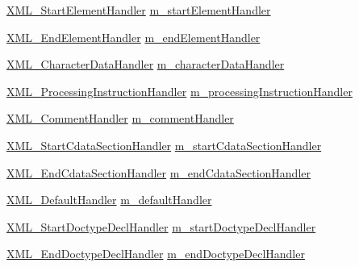 \begin{DoxyCompactItemize}
\item 
\hyperlink{amiga_2include_2libraries_2expat_8h_ae673a34e69303b3e6e9d112ddcc86aad}{X\+M\+L\+\_\+\+Start\+Element\+Handler} \hyperlink{struct_x_m_l___parser_struct_a26ab50091182d50019ce89e2ee3470f2}{m\+\_\+start\+Element\+Handler}
\item 
\hyperlink{amiga_2include_2libraries_2expat_8h_a4c030e2ecb6cf8f953541923e0c5c4bc}{X\+M\+L\+\_\+\+End\+Element\+Handler} \hyperlink{struct_x_m_l___parser_struct_a34f436a34d445e34bd94e45a39ec049c}{m\+\_\+end\+Element\+Handler}
\item 
\hyperlink{amiga_2include_2libraries_2expat_8h_a49ea4b8c43b9d179add2746e20a5db97}{X\+M\+L\+\_\+\+Character\+Data\+Handler} \hyperlink{struct_x_m_l___parser_struct_ae0b82e8ee9b1917e4985d2414a971cff}{m\+\_\+character\+Data\+Handler}
\item 
\hyperlink{amiga_2include_2libraries_2expat_8h_aea2f9d08064fb45ff04f9e74b6b407c2}{X\+M\+L\+\_\+\+Processing\+Instruction\+Handler} \hyperlink{struct_x_m_l___parser_struct_adf3617fbf15fbfaba11fce4fbf7a0e5a}{m\+\_\+processing\+Instruction\+Handler}
\item 
\hyperlink{amiga_2include_2libraries_2expat_8h_a7bf5731181aec35012d70d1634edcef1}{X\+M\+L\+\_\+\+Comment\+Handler} \hyperlink{struct_x_m_l___parser_struct_a11f04d39e260cdc3355961c41cde40e8}{m\+\_\+comment\+Handler}
\item 
\hyperlink{amiga_2include_2libraries_2expat_8h_a68a18e698f04c0cfedac814093d01a43}{X\+M\+L\+\_\+\+Start\+Cdata\+Section\+Handler} \hyperlink{struct_x_m_l___parser_struct_af177c35f5a57d5690ba8c20421db3bf9}{m\+\_\+start\+Cdata\+Section\+Handler}
\item 
\hyperlink{amiga_2include_2libraries_2expat_8h_a52f3541344fd2e255bbd06f6b08321e2}{X\+M\+L\+\_\+\+End\+Cdata\+Section\+Handler} \hyperlink{struct_x_m_l___parser_struct_a70db3e55041515448701d7243f289b05}{m\+\_\+end\+Cdata\+Section\+Handler}
\item 
\hyperlink{amiga_2include_2libraries_2expat_8h_adbfd4da0da32dc94f3f99d1504ff579e}{X\+M\+L\+\_\+\+Default\+Handler} \hyperlink{struct_x_m_l___parser_struct_ab8146045cb37e8c1081949023c2c6d72}{m\+\_\+default\+Handler}
\item 
\hyperlink{amiga_2include_2libraries_2expat_8h_abc8c0b8372904ae53fa99781b108c5d5}{X\+M\+L\+\_\+\+Start\+Doctype\+Decl\+Handler} \hyperlink{struct_x_m_l___parser_struct_ac111d477fa011eaf91577b1054b38ebe}{m\+\_\+start\+Doctype\+Decl\+Handler}
\item 
\hyperlink{lib_2expat_8h_a43568a006caf34bcf94e4346031b85a0}{X\+M\+L\+\_\+\+End\+Doctype\+Decl\+Handler} \hyperlink{struct_x_m_l___parser_struct_a06e9c9cc127118f5471b45666697e49a}{m\+\_\+end\+Doctype\+Decl\+Handler}

\end{DoxyCompactItemize}
